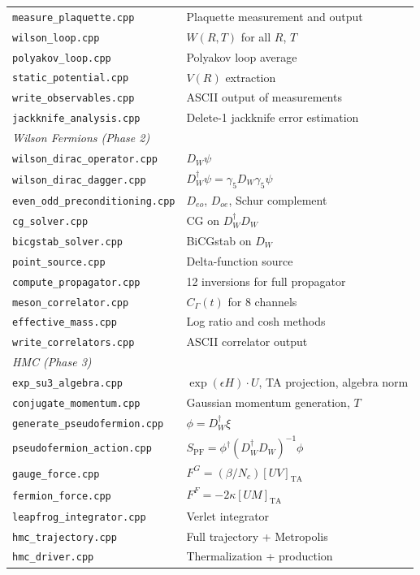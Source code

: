 \documentclass[12pt]{article}
\newcommand{\code}[1]{\texttt{#1}}
\begin{document}
\begin{longtable}{lp{8cm}}
\code{measure\_plaquette.cpp} & Plaquette measurement and output \\
\code{wilson\_loop.cpp} & $W(R,T)$ for all $R$, $T$ \\
\code{polyakov\_loop.cpp} & Polyakov loop average \\
\code{static\_potential.cpp} & $V(R)$ extraction \\
\code{write\_observables.cpp} & ASCII output of measurements \\
\code{jackknife\_analysis.cpp} & Delete-1 jackknife error estimation \\
\midrule
\multicolumn{2}{l}{\textit{Wilson Fermions (Phase 2)}} \\
\code{wilson\_dirac\_operator.cpp} & $D_W \psi$ \\
\code{wilson\_dirac\_dagger.cpp} & $D_W^\dagger \psi = \gamma_5 D_W \gamma_5 \psi$ \\
\code{even\_odd\_preconditioning.cpp} & $D_{eo}$, $D_{oe}$, Schur complement \\
\code{cg\_solver.cpp} & CG on $D_W^\dagger D_W$ \\
\code{bicgstab\_solver.cpp} & BiCGstab on $D_W$ \\
\code{point\_source.cpp} & Delta-function source \\
\code{compute\_propagator.cpp} & 12 inversions for full propagator \\
\code{meson\_correlator.cpp} & $C_\Gamma(t)$ for 8 channels \\
\code{effective\_mass.cpp} & Log ratio and cosh methods \\
\code{write\_correlators.cpp} & ASCII correlator output \\
\midrule
\multicolumn{2}{l}{\textit{HMC (Phase 3)}} \\
\code{exp\_su3\_algebra.cpp} & $\exp(\epsilon H) \cdot U$, TA projection, algebra norm \\
\code{conjugate\_momentum.cpp} & Gaussian momentum generation, $T$ \\
\code{generate\_pseudofermion.cpp} & $\phi = D_W^\dagger \xi$ \\
\code{pseudofermion\_action.cpp} & $S_{\mathrm{PF}} = \phi^\dagger (D_W^\dagger D_W)^{-1} \phi$ \\
\code{gauge\_force.cpp} & $F^G = (\beta/N_c)[U V]_{\mathrm{TA}}$ \\
\code{fermion\_force.cpp} & $F^F = -2\kappa [U M]_{\mathrm{TA}}$ \\
\code{leapfrog\_integrator.cpp} & Verlet integrator \\
\code{hmc\_trajectory.cpp} & Full trajectory + Metropolis \\
\code{hmc\_driver.cpp} & Thermalization + production \\
\end{longtable}
\end{document}
